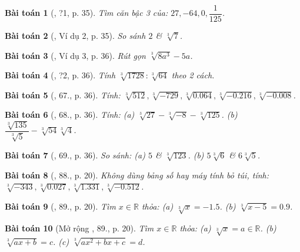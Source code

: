 \documentclass{article}
\newtheorem{baitoan}{Bài toán}
\begin{document}
\begin{baitoan}[\cite{SGK_Toan_9_tap_1}, ?1, p. 35]
	Tìm căn bậc 3 của: $27,-64,0,\dfrac{1}{125}$.
\end{baitoan}

\begin{baitoan}[\cite{SGK_Toan_9_tap_1}, Ví dụ 2, p. 35]
	So sánh $2$ \& $\sqrt[3]{7}$.
\end{baitoan}

\begin{baitoan}[\cite{SGK_Toan_9_tap_1}, Ví dụ 3, p. 36]
	Rút gọn $\sqrt[3]{8a^3} - 5a$.
\end{baitoan}

\begin{baitoan}[\cite{SGK_Toan_9_tap_1}, ?2, p. 36]
	Tính $\sqrt[3]{1728}:\sqrt[3]{64}$ theo 2 cách.
\end{baitoan}

\begin{baitoan}[\cite{SGK_Toan_9_tap_1}, 67., p. 36]
	Tính: $\sqrt[3]{512},\sqrt[3]{-729},\sqrt[3]{0.064},\sqrt[3]{-0.216},\sqrt[3]{-0.008}$.
\end{baitoan}

\begin{baitoan}[\cite{SGK_Toan_9_tap_1}, 68., p. 36]
	Tính: (a) $\sqrt[3]{27} - \sqrt[3]{-8} - \sqrt[3]{125}$. (b) $\dfrac{\sqrt[3]{135}}{\sqrt[3]{5}} - \sqrt[3]{54}\sqrt[3]{4}$.
\end{baitoan}

\begin{baitoan}[\cite{SGK_Toan_9_tap_1}, 69., p. 36]
	So sánh: (a) $5$ \& $\sqrt[3]{123}$. (b) $5\sqrt[3]{6}$ \& $6\sqrt[3]{5}$.
\end{baitoan}

\begin{baitoan}[\cite{SBT_Toan_9_tap_1}, 88., p. 20]
	Không dùng bảng số hay máy tính bỏ túi, tính: $\sqrt[3]{-343},\sqrt[3]{0.027},\sqrt[3]{1.331},\sqrt[3]{-0.512}$.
\end{baitoan}

\begin{baitoan}[\cite{SBT_Toan_9_tap_1}, 89., p. 20]
	Tìm $x\in\mathbb{R}$ thỏa: (a) $\sqrt[3]{x} = -1.5$. (b) $\sqrt[3]{x - 5} = 0.9$.
\end{baitoan}

\begin{baitoan}[Mở rộng \cite{SBT_Toan_9_tap_1}, 89., p. 20]
	Tìm $x\in\mathbb{R}$ thỏa: (a) $\sqrt[3]{x} = a\in\mathbb{R}$. (b) $\sqrt[3]{ax + b} = c$. (c) $\sqrt[3]{ax^2 + bx + c} = d$.
\end{baitoan}
\end{document}
